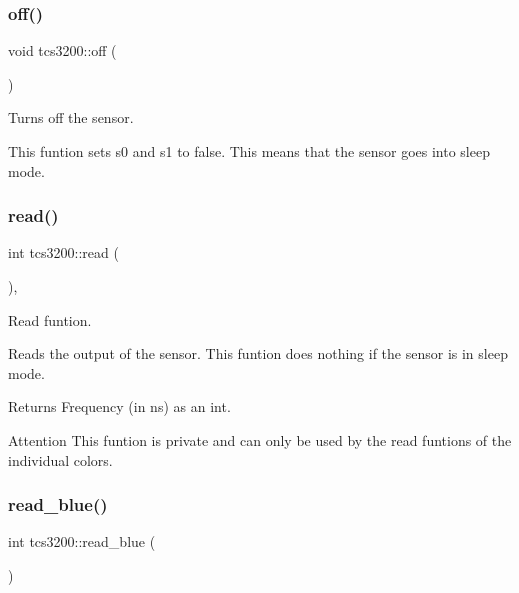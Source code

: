 \subsubsection{\texorpdfstring{off()}{off()}}
{\footnotesize\ttfamily void tcs3200\+::off (\begin{DoxyParamCaption}{ }\end{DoxyParamCaption})\hspace{0.3cm}{\ttfamily [inline]}}



Turns off the sensor. 

This funtion sets s0 and s1 to false. This means that the sensor goes into sleep mode. \mbox{\label{classtcs3200_a02b9d9553e97b38bd3aab87bc5ea84b2}} 
\subsubsection{\texorpdfstring{read()}{read()}}
{\footnotesize\ttfamily int tcs3200\+::read (\begin{DoxyParamCaption}{ }\end{DoxyParamCaption})\hspace{0.3cm}{\ttfamily [inline]}, {\ttfamily [private]}}



Read funtion. 

Reads the output of the sensor. This funtion does nothing if the sensor is in sleep mode. \begin{DoxyReturn}{Returns}
Frequency (in ns) as an int. 
\end{DoxyReturn}
\begin{DoxyAttention}{Attention}
This funtion is private and can only be used by the read funtions of the individual colors. 
\end{DoxyAttention}
\mbox{\label{classtcs3200_a3601b40b4b7f40625e9e1acb4cb0f7ff}} 
\subsubsection{\texorpdfstring{read\+\_\+blue()}{read\_blue()}}
{\footnotesize\ttfamily int tcs3200\+::read\+\_\+blue (\begin{DoxyParamCaption}{ }\end{DoxyParamCaption})\hspace{0.3cm}{\ttfamily [inline]}}



